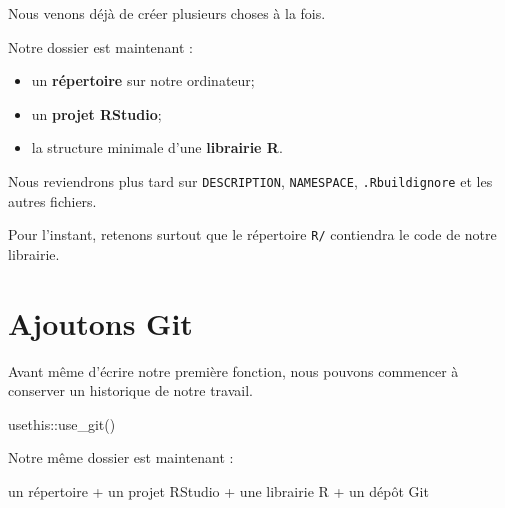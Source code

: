 \documentclass[
  letterpaper,
  DIV=11,
  numbers=noendperiod]{scrreprt}
\newenvironment{Shaded}{\begin{snugshade}}{\end{snugshade}}
\newcommand{\FunctionTok}[1]{\textcolor[rgb]{0.28,0.35,0.67}{#1}}
\newcommand{\NormalTok}[1]{\textcolor[rgb]{0.00,0.23,0.31}{#1}}
\newcommand{\SpecialCharTok}[1]{\textcolor[rgb]{0.37,0.37,0.37}{#1}}
\providecommand{\tightlist}{%
  \setlength{\itemsep}{0pt}\setlength{\parskip}{0pt}}\usepackage{longtable,booktabs,array}
\begin{document}
Nous venons déjà de créer plusieurs choses à la fois.

Notre dossier est maintenant :

\begin{itemize}
\tightlist
\item
  un \textbf{répertoire} sur notre ordinateur;
\item
  un \textbf{projet RStudio};
\item
  la structure minimale d'une \textbf{librairie R}.
\end{itemize}

\begin{tcolorbox}[enhanced jigsaw, arc=.35mm, title=\textcolor{quarto-callout-tip-color}{\faLightbulb}\hspace{0.5em}{Ne cherchons pas encore à tout comprendre}, colback=white, left=2mm, rightrule=.15mm, toptitle=1mm, opacityback=0, bottomtitle=1mm, breakable, colframe=quarto-callout-tip-color-frame, coltitle=black, toprule=.15mm, titlerule=0mm, opacitybacktitle=0.6, bottomrule=.15mm, colbacktitle=quarto-callout-tip-color!10!white, leftrule=.75mm]

Nous reviendrons plus tard sur \texttt{DESCRIPTION}, \texttt{NAMESPACE},
\texttt{.Rbuildignore} et les autres fichiers.

Pour l'instant, retenons surtout que le répertoire \texttt{R/}
contiendra le code de notre librairie.

\end{tcolorbox}

\section{Ajoutons Git}\label{ajoutons-git}

Avant même d'écrire notre première fonction, nous pouvons commencer à
conserver un historique de notre travail.

\begin{Shaded}
\begin{Highlighting}[]
\NormalTok{usethis}\SpecialCharTok{::}\FunctionTok{use\_git}\NormalTok{()}
\end{Highlighting}
\end{Shaded}

Notre même dossier est maintenant :

\begin{Shaded}
\begin{Highlighting}[]
\NormalTok{un répertoire}
\NormalTok{      +}
\NormalTok{un projet RStudio}
\NormalTok{      +}
\NormalTok{une librairie R}
\NormalTok{      +}
\NormalTok{un dépôt Git}
\end{Highlighting}
\end{Shaded}
\end{document}
